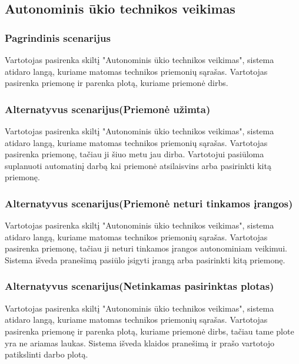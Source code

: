 \documentclass[oneside]{VUMIFPSkursinis}
\begin{document}
\subsection{Autonominis ūkio technikos veikimas}
\subsubsection{Pagrindinis scenarijus}
	Vartotojas pasirenka skiltį "Autonominis ūkio technikos veikimas", sistema atidaro langą, kuriame matomas technikos priemonių sąrašas. Vartotojas pasirenka priemonę ir parenka plotą, kuriame priemonė dirbs.
\subsubsection{Alternatyvus scenarijus(Priemonė užimta)}
	Vartotojas pasirenka skiltį "Autonominis ūkio technikos veikimas", sistema atidaro langą, kuriame matomas technikos priemonių sąrašas. Vartotojas pasirenka priemonę, tačiau ji šiuo metu jau dirba. Vartotojui pasiūloma suplanuoti automatinį darbą kai priemonė atsilaisvins arba pasirinkti kitą priemonę.
\subsubsection{Alternatyvus scenarijus(Priemonė neturi tinkamos įrangos)}
	Vartotojas pasirenka skiltį "Autonominis ūkio technikos veikimas", sistema atidaro langą, kuriame matomas technikos priemonių sąrašas. Vartotojas pasirenka priemonę, tačiau ji neturi tinkamos įrangos autonominiam veikimui. Sistema išveda pranešimą pasiūlo įsigyti įrangą arba pasirinkti kitą priemonę.
\subsubsection{Alternatyvus scenarijus(Netinkamas pasirinktas plotas)}
	Vartotojas pasirenka skiltį "Autonominis ūkio technikos veikimas", sistema atidaro langą, kuriame matomas technikos priemonių sąrašas. Vartotojas pasirenka priemonę ir parenka plotą, kuriame priemonė dirbs, tačiau tame plote yra ne ariamas laukas. Sistema išveda klaidos pranešimą ir prašo vartotojo patikslinti darbo plotą.
\end{document}
